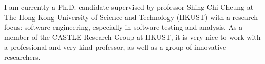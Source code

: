 %
%
%
\par{
    I am currently a Ph.D. candidate supervised by professor Shing-Chi Cheung at The Hong Kong University of Science and Technology (HKUST) with a research focus: software engineering, especially in software testing and analysis.
    As a member of the CASTLE Research Group at HKUST, it is very nice to work with a professional and very kind professor, as well as a group of innovative researchers.
}
